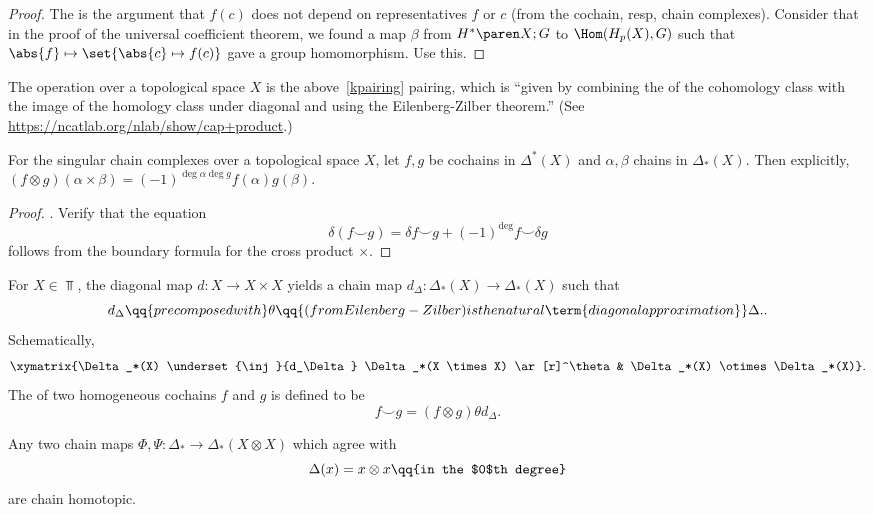 \begin{proof}
The  is the argument that $f(c)$ does not depend on representatives $f$ or $c$ (from the cochain, resp, chain complexes). Consider that in the proof of the universal coefficient theorem, we found a map $\beta$ from $\coho{X}{G}$ to $\Hom(H_p(X), G)$ such that $\abs{f} \mapsto \set{ \abs{c} \mapsto f(c) }$ gave a group homomorphism. Use this.
\end{proof}

\begin{defn}
   The  operation over a topological space $X$ is the above~\eqref{kpairing} pairing, which is ``given by combining the  of the cohomology class with the image of the homology class under diagonal and using the Eilenberg-Zilber theorem.'' (See \url{https://ncatlab.org/nlab/show/cap+product}.)
\end{defn}

\begin{prop}
   For the singular chain complexes over a topological space $X$, let $f, g$ be cochains in $\Delta^*(X)$ and $\alpha, \beta$ chains in $\Delta_*(X)$. Then explicitly, 
    $(f\otimes g)(\alpha \times \beta) = (-1)^{\deg \alpha \deg g} f(\alpha)g(\beta)$.
\end{prop}

\begin{proof}
\TODO. Verify that the equation
\[
    \delta(f \smile g) = \delta f \smile g + (-1)^{\deg}f \smile \delta g
\]
follows from the boundary formula for the cross product $\times$.
\end{proof}

\begin{defn}
   For $X \in \Top$, the diagonal map $d \colon X \to X \times X$ yields a chain map $d_\Delta \colon \Delta_*(X) \to \Delta_*(X)$ such that 
   \[
      d_\Delta \qq{precomposed with} \theta \qq{(from Eilenberg-Zilber) is the natural \term{diagonal approximation}} \Delta.
   .\]
   Schematically,
   \[
      \xymatrix{\Delta_*(X) \underset{\inj}{d_\Delta} \Delta_*(X \times X) \ar[r]^\theta 
                  & \Delta_*(X) \otimes \Delta_*(X)}
   .\]
   The  of two homogeneous cochains $f$ and $g$ is defined to be \[f \smile g = (f \otimes g) \theta d_\Delta.\]
\end{defn}

\begin{todo}
    Any two chain maps $\Phi, \Psi \colon \Delta_*\to \Delta_*(X\otimes X)$ which agree with 
    \[
        \Delta(x) = x \otimes x \qq{in the $0$th degree}
    \]
    are chain homotopic.  
\end{todo}

